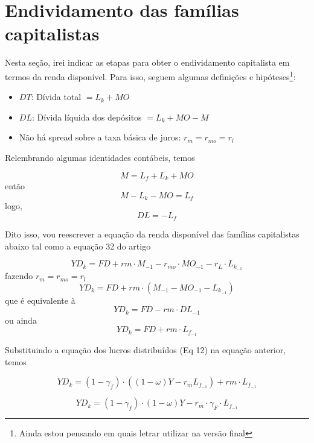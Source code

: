\documentclass[11pt]{article}
\begin{document}
\section*{Endividamento das famílias capitalistas}
\label{sec:org2b36d9c}

Nesta seção, irei indicar as etapas para obter o endividamento capitalista em termos da renda disponível. Para isso, seguem algumas definições e hipóteses\footnote{Ainda estou pensando em quais letrar utilizar na versão final}:

\begin{itemize}
\item \(DT\): Dívida total \(= L_k + MO\)
\item \(DL\): Dívida líquida dos depósitos \(= L_k + MO - M\)
\item Não há spread sobre a taxa básica de juros: \(r_m = r_{mo} = r_l\)
\end{itemize}

Relembrando algumas identidades contábeis, temos

$$
M = L_f + L_k + MO
$$
então
$$
M - L_k - MO = L_f
$$
logo, 
\begin{equation}
\label{DL}
DL = -L_f
\end{equation}

Dito isso, vou reescrever a equação da renda disponível das famílias capitalistas abaixo tal como a equação 32 do artigo

\begin{equation}
\tag{32}
YD_k = FD + rm\cdot M_{-1} - r_{mo}\cdot MO_{-1}  - r_{L}\cdot L_{k_{-1}}
\end{equation}
fazendo \(r_m = r_{mo} = r_l\)
\begin{equation}
YD_k = FD + rm\cdot (M_{-1} - MO_{-1}  - L_{k_{-1}})
\end{equation}
que é equivalente à 
\begin{equation}
YD_k = FD - rm\cdot DL_{-1}
\end{equation}
ou ainda
\begin{equation}
YD_k = FD + rm\cdot L_{f_{-1}}
\end{equation}

Substituindo a equação dos lucros distribuídos (Eq 12) na equação anterior, temos

\begin{equation}
YD_k = (1-\gamma_f)\cdot ((1-\omega)Y - r_m L_{f_{-1}}) + rm\cdot L_{f_{-1}}
\end{equation}

\begin{equation}
\label{New_YD}
YD_k = (1-\gamma_f)\cdot (1-\omega)Y - r_m \cdot \gamma_F \cdot L_{f_{-1}}
\end{equation}
\end{document}
